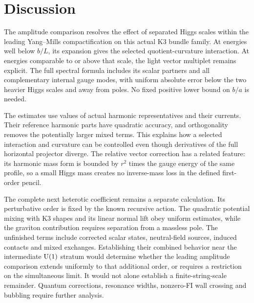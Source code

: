 \section{Discussion}\label{sec:discussion}

The amplitude comparison resolves the effect of separated Higgs scales
within the leading Yang--Mills compactification on this actual K3 bundle
family. At energies well below $b/L$, its expansion gives the selected
quotient-curvature interaction. At energies comparable to or above that
scale, the light vector multiplet remains explicit. The full spectral
formula includes its scalar partners and all complementary internal
gauge modes, with uniform absolute error below the two heavier Higgs
scales and away from poles. No fixed positive lower bound on $b/a$ is
needed.

The estimates use values of actual harmonic representatives and their
currents. Their reference harmonic parts have quadratic accuracy, and
orthogonality removes the potentially larger mixed terms. This explains
how a selected interaction and curvature can be controlled even though
derivatives of the full horizontal projector diverge. The relative
vector correction has a related feature: its harmonic mass form is
bounded by $r^2$ times the gauge energy of the same profile, so a small
Higgs mass creates no inverse-mass loss in the defined first-order pencil.

The complete next heterotic coefficient remains a separate calculation.
Its perturbative order is fixed by the known recursive action. The
quadratic potential mixing with K3 shapes and its linear normal lift obey uniform
estimates, while the graviton contribution requires separation from
a massless pole.
The unfinished terms include corrected scalar states, neutral-field
sources, induced contacts and mixed exchanges. Establishing their
combined behavior near the intermediate $\operatorname{U}(1)$ stratum would determine
whether the leading amplitude comparison extends uniformly to that
additional order, or requires a restriction on the simultaneous limit.
It would not alone establish a finite-string-scale remainder. Quantum
corrections, resonance widths, nonzero-FI wall crossing and bubbling
require further analysis.
